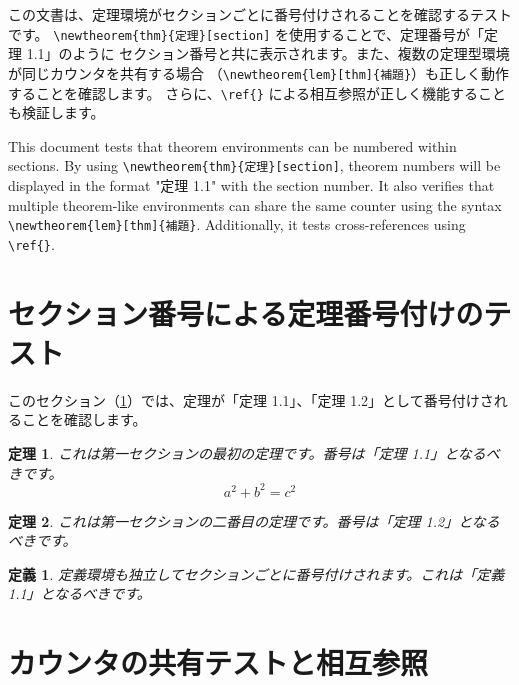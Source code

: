 \documentclass[master]{kuisthesis}
\date{2025年1月31日}
\newtheorem{thm}{定理}[section]
\newtheorem{defn}{定義}[section]
\begin{document}
\maketitle

\begin{jabstract}
この文書は、定理環境がセクションごとに番号付けされることを確認するテストです。
\verb|\newtheorem{thm}{定理}[section]| を使用することで、定理番号が「定理 1.1」のように
セクション番号と共に表示されます。また、複数の定理型環境が同じカウンタを共有する場合
（\verb|\newtheorem{lem}[thm]{補題}|）も正しく動作することを確認します。
さらに、\verb|\ref{}| による相互参照が正しく機能することも検証します。
\end{jabstract}

\begin{eabstract}
This document tests that theorem environments can be numbered within sections.
By using \verb|\newtheorem{thm}{定理}[section]|, theorem numbers will be displayed
in the format "定理 1.1" with the section number. It also verifies that multiple
theorem-like environments can share the same counter using the syntax
\verb|\newtheorem{lem}[thm]{補題}|. Additionally, it tests cross-references
using \verb|\ref{}|.
\end{eabstract}

\tableofcontents

\section{セクション番号による定理番号付けのテスト}
\label{sec:first}

このセクション（\ref{sec:first}）では、定理が「定理 1.1」、「定理 1.2」として番号付けされることを確認します。

\begin{thm}\label{thm:first}
これは第一セクションの最初の定理です。番号は「定理 1.1」となるべきです。
$$ a^2 + b^2 = c^2 $$
\end{thm}

\begin{thm}\label{thm:second}
これは第一セクションの二番目の定理です。番号は「定理 1.2」となるべきです。
\end{thm}

\begin{defn}\label{defn:first}
定義環境も独立してセクションごとに番号付けされます。これは「定義 1.1」となるべきです。
\end{defn}

\section{カウンタの共有テストと相互参照}
\label{sec:second}
\end{document}
